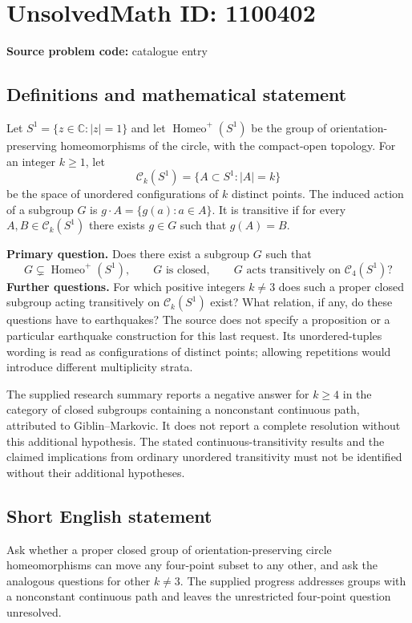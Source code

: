 \documentclass[11pt]{article}
\begin{document}
\section*{UnsolvedMath ID: 1100402}
\textbf{Source problem code:} catalogue entry
\subsection{Definitions and mathematical statement}
Let $S^1=\{z\in\mathbb C:|z|=1\}$ and let $\operatorname{Homeo}^{+}(S^1)$ be the group of orientation-preserving homeomorphisms of the circle, with the compact-open topology. For an integer $k\geq1$, let
\[
\mathcal C_k(S^1)=\{A\subset S^1:|A|=k\}
\]
be the space of unordered configurations of $k$ distinct points. The induced action of a subgroup $G$ is $g\cdot A=\{g(a):a\in A\}$. It is transitive if for every $A,B\in\mathcal C_k(S^1)$ there exists $g\in G$ such that $g(A)=B$.

\textbf{Primary question.} Does there exist a subgroup $G$ such that
\[
G\subsetneq\operatorname{Homeo}^{+}(S^1),\qquad
G\text{ is closed},\qquad
G\text{ acts transitively on }\mathcal C_4(S^1)?
\]
\textbf{Further questions.} For which positive integers $k\ne3$ does such a proper closed subgroup acting transitively on $\mathcal C_k(S^1)$ exist? What relation, if any, do these questions have to earthquakes? The source does not specify a proposition or a particular earthquake construction for this last request. Its unordered-tuples wording is read as configurations of distinct points; allowing repetitions would introduce different multiplicity strata.

The supplied research summary reports a negative answer for $k\geq4$ in the category of closed subgroups containing a nonconstant continuous path, attributed to Giblin--Markovic. It does not report a complete resolution without this additional hypothesis. The stated continuous-transitivity results and the claimed implications from ordinary unordered transitivity must not be identified without their additional hypotheses.
\subsection{Short English statement}
Ask whether a proper closed group of orientation-preserving circle homeomorphisms can move any four-point subset to any other, and ask the analogous questions for other $k\ne3$. The supplied progress addresses groups with a nonconstant continuous path and leaves the unrestricted four-point question unresolved.
\end{document}
